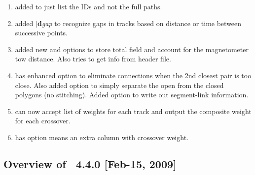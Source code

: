 \begin{enumerate}
	\item {} added  to just list the IDs and not the full paths.
	\item {} added $|${\bf d}{\it gap} to recognize gaps in tracks based on
		distance or time between successive points.
	\item {} added new  and  options to store total field and account for the
		magnetometer tow distance. Also tries to get info from header file.
	\item {} has enhanced  option to eliminate connections when the 2nd closest
		pair is too close.  Also added  option to simply separate the open from the closed polygons (no stitching).
		Added  option to write out segment-link information.
	\item {} can now accept list of weights for each track and output the
			composite weight for each crossover.
	\item {} has option  means an extra column with crossover weight.
\end{enumerate}


\subsection{Overview of \gmt\ 4.4.0 [Feb-15, 2009]}

